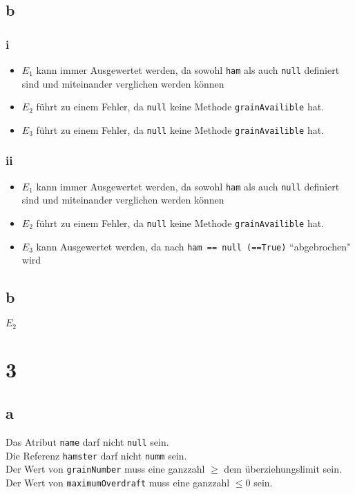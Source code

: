 \documentclass{article}
\begin{document}
\subsection*{b}
\subsubsection*{i}
\begin{itemize}
    \item { $E_1$ kann immer Ausgewertet werden, da sowohl 
    \verb|ham| als auch \verb|null| definiert sind und
    miteinander verglichen werden können }
    \item { $E_2$ führt zu einem Fehler, da \verb|null| keine
    Methode \verb|grainAvailible| hat.}
    \item { $E_3$ führt zu einem Fehler, da \verb|null| keine
    Methode \verb|grainAvailible| hat.}
\end{itemize}
\subsubsection*{ii}
\begin{itemize}
    \item { $E_1$ kann immer Ausgewertet werden, da sowohl 
    \verb|ham| als auch \verb|null| definiert sind und
    miteinander verglichen werden können }
    \item { $E_2$ führt zu einem Fehler, da \verb|null| keine
    Methode \verb|grainAvailible| hat.}
    \item{ $E_3$ kann Ausgewertet werden, da nach
    \verb|ham == null (==True)| ``abgebrochen" wird}
\end{itemize}
\subsection*{b}
$E_2$ 
\section*{3}
\subsection*{a}
Das Atribut \verb|name| darf nicht \verb|null| sein.\\
Die Referenz \verb|hamster| darf nicht \verb|numm| sein.\\
Der Wert von \verb|grainNumber| muss eine ganzzahl $\geq$ dem überziehungslimit sein.\\
Der Wert von \verb|maximumOverdraft| muss eine ganzzahl $\leq 0$ sein.
\end{document}
